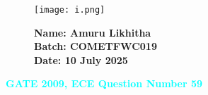 \documentclass[12pt]{article}
\begin{document}
\begin{figure}[H]
    \begin{minipage}{0.45\textwidth}
        \texttt{[image: i.png]} %
    \end{minipage} \hfill
    \begin{minipage}{0.45\textwidth}
        \textbf{Name: Amuru Likhitha} \\
        \textbf{Batch: COMETFWC019} \\
        \textbf{Date: 10 July 2025}
    \end{minipage}
\end{figure}

\begin{center}
    {\LARGE \textbf{\textcolor{cyan}{GATE 2009, ECE Question Number 59}}}
\end{center}
\vspace{1em}
\end{document}
